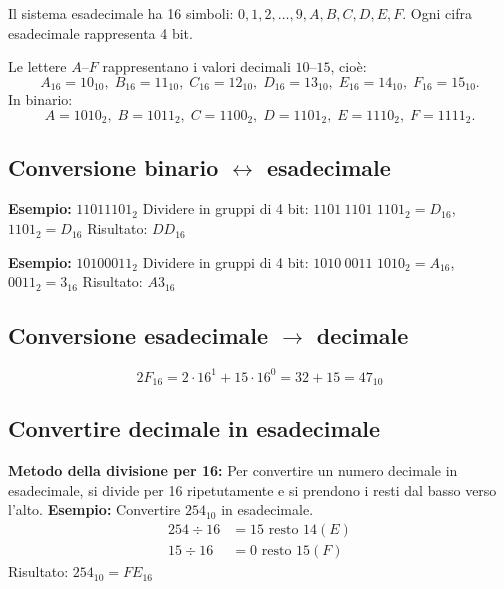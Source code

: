 \documentclass[12pt,a4paper]{article}
\begin{document}
Il sistema esadecimale ha 16 simboli: $0,1,2,\dots,9,A,B,C,D,E,F$.  
Ogni cifra esadecimale rappresenta 4 bit.

Le lettere $A$--$F$ rappresentano i valori decimali $10$--$15$, cioè:
$$A_{16}=10_{10},\; B_{16}=11_{10},\; C_{16}=12_{10},\; D_{16}=13_{10},\; E_{16}=14_{10},\; F_{16}=15_{10}.$$
In binario:
$$A=1010_2,\; B=1011_2,\; C=1100_2,\; D=1101_2,\; E=1110_2,\; F=1111_2.$$

\subsection{Conversione binario \texorpdfstring{$\leftrightarrow$}{<->} esadecimale}

\textbf{Esempio:} $11011101_2$  
Dividere in gruppi di 4 bit: $1101\ 1101$  
$1101_2 = D_{16}$, $1101_2 = D_{16}$  
Risultato: $DD_{16}$

\textbf{Esempio:} $10100011_2$
Dividere in gruppi di 4 bit: $1010\ 0011$  
$1010_2 = A_{16}$, $0011_2 = 3_{16}$  
Risultato: $A3_{16}$

\subsection{Conversione esadecimale \texorpdfstring{$\to$}{->} decimale}

\[
2F_{16} = 2\cdot16^1 + 15\cdot16^0 = 32 + 15 = 47_{10}
\]

\subsection{Convertire decimale in esadecimale}
\textbf{Metodo della divisione per 16:}
Per convertire un numero decimale in esadecimale, si divide
per 16 ripetutamente e si prendono i resti dal basso verso l'alto.
\textbf{Esempio:} Convertire $254_{10}$ in esadecimale.
\begin{align*}
254 \div 16 &= 15 \text{ resto } 14 (E) \\
15 \div 16 &= 0 \text{ resto } 15 (F)
\end{align*}
Risultato: $254_{10} = FE_{16}$
\end{document}
